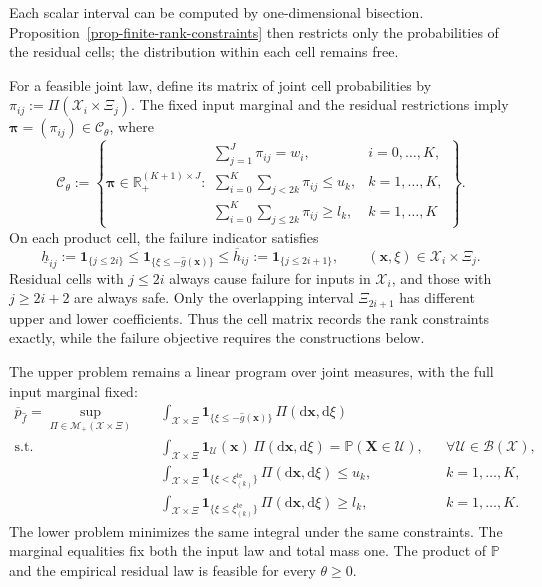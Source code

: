 \documentclass[review,11pt,3p,authoryear,nopreprintline]{elsarticle}
\begin{document}
Each scalar interval can be computed by one-dimensional bisection. Proposition~\ref{prop-finite-rank-constraints} then restricts only the probabilities of the residual cells; the distribution within each cell remains free.

For a feasible joint law, define its matrix of joint cell probabilities by $\pi_{ij}:=\Pi(\mathcal X_i\times\Xi_j)$. The fixed input marginal and the residual restrictions imply $\bm\pi=(\pi_{ij})\in\mathcal C_\theta$, where
\begin{equation}
  \mathcal C_\theta:=\left\{\bm\pi\in\mathbb R_+^{(K+1)\times J}:
  \begin{array}{ll}
    \displaystyle\sum_{j=1}^{J}\pi_{ij}=w_i,&i=0,\ldots,K,\\[1mm]
    \displaystyle\sum_{i=0}^{K}\sum_{j<2k}\pi_{ij}\le u_k,&k=1,\ldots,K,\\[1mm]
    \displaystyle\sum_{i=0}^{K}\sum_{j\le2k}\pi_{ij}\ge l_k,&k=1,\ldots,K
  \end{array}\right\}.
  \label{eq-cell-mass-polytope}
\end{equation}
On each product cell, the failure indicator satisfies
\begin{equation}
  \underline h_{ij}:=\mathbf1_{\{j\le2i\}}
  \le\mathbf1_{\{\xi\le-\hat g(\bm x)\}}
  \le\overline h_{ij}:=\mathbf1_{\{j\le2i+1\}},
  \qquad (\bm x,\xi)\in\mathcal X_i\times\Xi_j.
  \label{eq-cell-costs}
\end{equation}
Residual cells with $j\le2i$ always cause failure for inputs in $\mathcal X_i$, and those with $j\ge2i+2$ are always safe. Only the overlapping interval $\Xi_{2i+1}$ has different upper and lower coefficients. Thus the cell matrix records the rank constraints exactly, while the failure objective requires the constructions below.

The upper problem remains a linear program over joint measures, with the full input marginal fixed:
\begin{equation}
  \begin{aligned}
    \overline p_{\hat f}
    =\sup_{\Pi\in\mathcal M_+(\mathcal X\times\Xi)}\quad&
      \int_{\mathcal X\times\Xi}\mathbf1_{\{\xi\le-\hat g(\bm x)\}}\,\Pi(\mathrm d\bm x,\mathrm d\xi)\\
    \text{s.t.}\quad&
      \int_{\mathcal X\times\Xi}\mathbf1_{\mathcal U}(\bm x)\,\Pi(\mathrm d\bm x,\mathrm d\xi)
        =\mathbb P(\bm X\in\mathcal U),&&\forall\mathcal U\in\mathcal B(\mathcal X),\\
    &\int_{\mathcal X\times\Xi}\mathbf1_{\{\xi<\xi_{(k)}^{\mathrm{te}}\}}\,\Pi(\mathrm d\bm x,\mathrm d\xi)\le u_k,
        &&k=1,\ldots,K,\\
    &\int_{\mathcal X\times\Xi}\mathbf1_{\{\xi\le\xi_{(k)}^{\mathrm{te}}\}}\,\Pi(\mathrm d\bm x,\mathrm d\xi)\ge l_k,
        &&k=1,\ldots,K.
  \end{aligned}
  \label{eq-measure-upper}
\end{equation}
The lower problem minimizes the same integral under the same constraints. The marginal equalities fix both the input law and total mass one. The product of $\mathbb P$ and the empirical residual law is feasible for every $\theta\ge0$.
\end{document}
